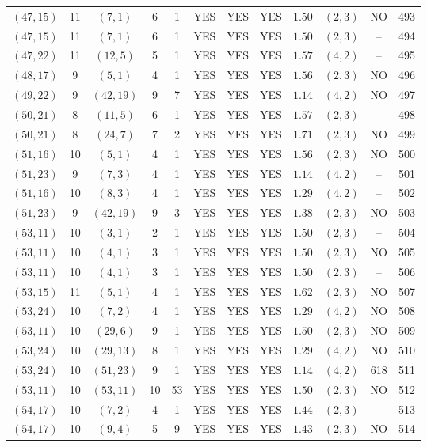 \begin{longtable}{|c|c|c|c|c|c|c|c|c|c|c|c|}
$(47,15)$ & 11 & $(7,1)$ & 6 & 1 & YES & YES & YES & $1.50$ & $(2,3)$ & NO & 493\\
$(47,15)$ & 11 & $(7,1)$ & 6 & 1 & YES & YES & YES & $1.50$ & $(2,3)$ & -- & 494\\
$(47,22)$ & 11 & $(12,5)$ & 5 & 1 & YES & YES & YES & $1.57$ & $(4,2)$ & -- & 495\\
$(48,17)$ & 9 & $(5,1)$ & 4 & 1 & YES & YES & YES & $1.56$ & $(2,3)$ & NO & 496\\
$(49,22)$ & 9 & $(42,19)$ & 9 & 7 & YES & YES & YES & $1.14$ & $(4,2)$ & NO & 497\\
$(50,21)$ & 8 & $(11,5)$ & 6 & 1 & YES & YES & YES & $1.57$ & $(2,3)$ & -- & 498\\
$(50,21)$ & 8 & $(24,7)$ & 7 & 2 & YES & YES & YES & $1.71$ & $(2,3)$ & NO & 499\\
$(51,16)$ & 10 & $(5,1)$ & 4 & 1 & YES & YES & YES & $1.56$ & $(2,3)$ & NO & 500\\
$(51,23)$ & 9 & $(7,3)$ & 4 & 1 & YES & YES & YES & $1.14$ & $(4,2)$ & -- & 501\\
$(51,16)$ & 10 & $(8,3)$ & 4 & 1 & YES & YES & YES & $1.29$ & $(4,2)$ & -- & 502\\
$(51,23)$ & 9 & $(42,19)$ & 9 & 3 & YES & YES & YES & $1.38$ & $(2,3)$ & NO & 503\\
$(53,11)$ & 10 & $(3,1)$ & 2 & 1 & YES & YES & YES & $1.50$ & $(2,3)$ & -- & 504\\
$(53,11)$ & 10 & $(4,1)$ & 3 & 1 & YES & YES & YES & $1.50$ & $(2,3)$ & NO & 505\\
$(53,11)$ & 10 & $(4,1)$ & 3 & 1 & YES & YES & YES & $1.50$ & $(2,3)$ & -- & 506\\
$(53,15)$ & 11 & $(5,1)$ & 4 & 1 & YES & YES & YES & $1.62$ & $(2,3)$ & NO & 507\\
$(53,24)$ & 10 & $(7,2)$ & 4 & 1 & YES & YES & YES & $1.29$ & $(4,2)$ & NO & 508\\
$(53,11)$ & 10 & $(29,6)$ & 9 & 1 & YES & YES & YES & $1.50$ & $(2,3)$ & NO & 509\\
$(53,24)$ & 10 & $(29,13)$ & 8 & 1 & YES & YES & YES & $1.29$ & $(4,2)$ & NO & 510\\
$(53,24)$ & 10 & $(51,23)$ & 9 & 1 & YES & YES & YES & $1.14$ & $(4,2)$ & 618 & 511\\
$(53,11)$ & 10 & $(53,11)$ & 10 & 53 & YES & YES & YES & $1.50$ & $(2,3)$ & NO & 512\\
$(54,17)$ & 10 & $(7,2)$ & 4 & 1 & YES & YES & YES & $1.44$ & $(2,3)$ & -- & 513\\
$(54,17)$ & 10 & $(9,4)$ & 5 & 9 & YES & YES & YES & $1.43$ & $(2,3)$ & NO & 514\\

\end{longtable}
